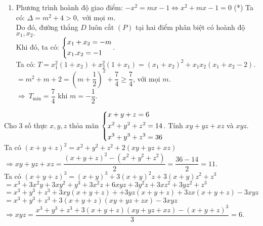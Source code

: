 \begin{ex}
{\begin{enumerate}
\begin{center}
\end{center}
        Phương trình hoành độ giao điểm: $-x^2=-5x+6\Leftrightarrow x^2-5x+6=0\Leftrightarrow x=2$ hoặc $x=3$.\\
        Vậy, tọa độ giao điểm là $A(2;-4)$ và $B(3;-9)$.
       \item Phương trình hoành độ giao điểm: $-{{x}^{2}}=mx-1\Leftrightarrow x^2+mx-1=0$  (*)
       Ta có: $\Delta =m^2+4>0,$ với mọi $m.$\\
       Do đó, đường thẳng $D$ luôn cắt $(P)$ tại hai điểm phân biệt có hoành độ $x_1, x_2.$\\
       Khi đó, ta có: $\left\{\begin{aligned}
       & x_1+x_2=-m \\
       & x_1.x_2=-1\end{aligned}\right.$.\\
       Ta có: $T=x_1^2(1+x_2)+x_2^2(1+x_1)=(x_1+x_2)^2+x_1x_2(x_1+x_2-2)$.
       $=m^2+m+2=\left( m+\dfrac{1}{2} \right)^2+\dfrac{7}{4}\ge \dfrac{7}{4}$, với mọi $m.$\\
       $\Rightarrow \ T_{\min} =\dfrac{7}{4}$ khi $m=-\dfrac{1}{2}.$
    \end{enumerate}
    }
\end{ex}

\begin{ex}%
    Cho 3 số thực $x,y,z$ thỏa mãn $\left\{\begin{aligned}
    & x+y+z=6 \\
    & x^2+y^2+z^2=14 \\
    & x^3+y^3+z^3=36\end{aligned}\right.$. Tính $xy+yz+xz$ và $xyz$.
\loigiai
    {
    Ta có $(x+y+z)^2=x^2+y^2+z^2+2(xy+yz+xz)$\\
   $\Rightarrow xy+yz+xz=\dfrac{(x+y+z)^2-(x^2+y^2+z^2)}{2}=\dfrac{36-14}{2}=11.$\\
   Ta có
   $(x+y+z)^3=(x+y)^3+3(x+y)^2z+3(x+y)z^2+z^3$\\
   $=x^3+3x^2y+3xy^2+y^3+3x^2z+6xyz+3y^2z+3xz^2+3yz^2+z^3$\\
   $=x^3+y^3+z^3+3xy(x+y+z)++3yz(x+y+z)+3zx(x+y+z)-3xyz$\\
   $=x^3+y^3+z^3+3(x+y+z)(xy+yz+zx)-3xyz$\\
   $\Rightarrow xyz=\dfrac{x^3+y^3+z^3+3(x+y+z)(xy+yz+xz)-(x+y+z)^3}{3}=6$.
    }
\end{ex}

